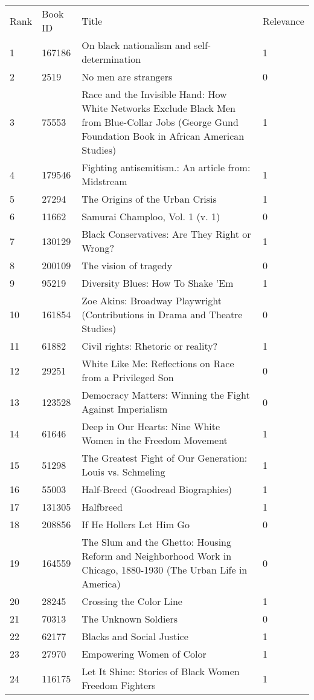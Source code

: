\begin{tabular}{llll}
\toprule
\midrule
Rank & Book ID & Title & Relevance \\
1 & 167186 & On black nationalism and self-determination & 1 \\
2 & 2519 & No men are strangers & 0 \\
3 & 75553 & Race and the Invisible Hand: How White Networks Exclude Black Men from Blue-Collar Jobs (George Gund Foundation Book in African American Studies) & 1 \\
4 & 179546 & Fighting antisemitism.: An article from: Midstream & 1 \\
5 & 27294 & The Origins of the Urban Crisis & 1 \\
6 & 11662 & Samurai Champloo, Vol. 1 (v. 1) & 0 \\
7 & 130129 & Black Conservatives: Are They Right or Wrong? & 1 \\
8 & 200109 & The vision of tragedy & 0 \\
9 & 95219 & Diversity Blues: How To Shake 'Em & 1 \\
10 & 161854 & Zoe Akins: Broadway Playwright (Contributions in Drama and Theatre Studies) & 0 \\
11 & 61882 & Civil rights: Rhetoric or reality? & 1 \\
12 & 29251 & White Like Me: Reflections on Race from a Privileged Son & 0 \\
13 & 123528 & Democracy Matters: Winning the Fight Against Imperialism & 0 \\
14 & 61646 & Deep in Our Hearts: Nine White Women in the Freedom Movement & 1 \\
15 & 51298 & The Greatest Fight of Our Generation: Louis vs. Schmeling & 1 \\
16 & 55003 & Half-Breed (Goodread Biographies) & 1 \\
17 & 131305 & Halfbreed & 1 \\
18 & 208856 & If He Hollers Let Him Go & 0 \\
19 & 164559 & The Slum and the Ghetto: Housing Reform and Neighborhood Work in Chicago, 1880-1930 (The Urban Life in America) & 0 \\
20 & 28245 & Crossing the Color Line & 1 \\
21 & 70313 & The Unknown Soldiers & 0 \\
22 & 62177 & Blacks and Social Justice & 1 \\
23 & 27970 & Empowering Women of Color & 1 \\
24 & 116175 & Let It Shine: Stories of Black Women Freedom Fighters & 1 \\

\end{tabular}
